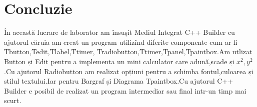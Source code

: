 \section*{Concluzie}
În această lucrare de laborator am însușit Mediul Integrat C++ Builder cu ajutorul căruia
am creat un program utilizînd diferite componente cum ar fi Tbutton,Tedit,Tlabel,Ttimer,
Tradiobutton,Ttimer,Tpanel,Tpaintbox.Am utlizat Button și Edit pentru a implementa un
mini calculator care adună,scade și $x^2,y^2$.Cu ajutorul Radiobutton am realizat opțiuni
pentru a schimba fontul,culoarea și stilul textului.Iar pentru Bargraf și Diagrama
Tpaintbox.Cu ajutorul C++ Builder e posibil de realizat un program intermediar sau final intr-un timp mai scurt.


\clearpage